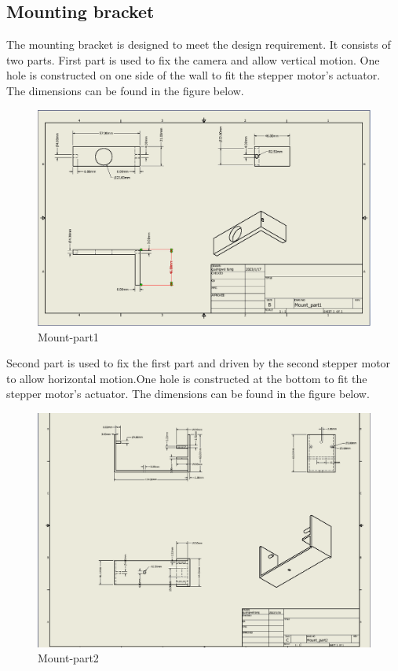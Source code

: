 \documentclass[12pt, titlepage]{article}
\begin{document}
\subsection{Mounting bracket}
The mounting bracket is designed to meet the design requirement. It consists of two parts. First part is used to fix the camera and allow vertical motion. One hole is constructed on one side of the wall to fit the stepper motor's actuator. The dimensions can be found in the  figure below.
\begin{figure}[H]
\caption{Mount-part1}
\centering
\includegraphics[width=\textwidth]{mount_part1.png}
\end{figure}
Second part is used to fix the first part and driven by the second stepper motor to allow horizontal motion.One hole is constructed at the bottom to fit the stepper motor's actuator. The dimensions can be found in the figure below.
\begin{figure}[H]
\caption{Mount-part2}
\centering
\includegraphics[width=\textwidth]{mount_part2.png}
\end{figure}
\end{document}

